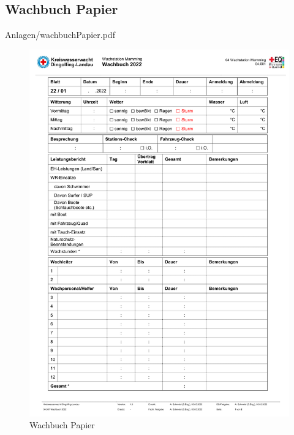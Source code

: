 \documentclass[fontsize=12pt,openright,oneside,paper=a4,BCOR=1cm]{scrbook}
\begin{document}
\begin{appendix}
\section{Wachbuch Papier}


    {Anlagen/wachbuchPapier.pdf}
\begin{figure}[H]
\centering
    \includegraphics[page=2,scale=0.75]{Anlagen/wachbuchPapier.pdf}
  \caption{Wachbuch Papier}
  \label{fig:wachbuchpapier}
\end{figure}


\end{appendix}

	 




\end{document}
